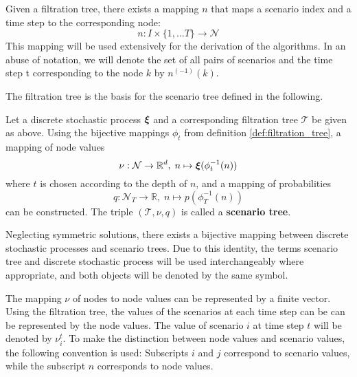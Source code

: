 \begin{remark}
  Given a filtration tree, there exists a mapping $n$ that maps a scenario index and a time step to the corresponding node:
  \begin{equation}
    \label{eq:71}
    n:I\times \{1,\ldots T\}\rightarrow\mathcal{N}
  \end{equation}
  This mapping will be used extensively for the derivation of the algorithms.
  In an abuse of notation, we will denote the set of all pairs of scenarios and the time step t corresponding to the node $k$ by $n^{(-1)}(k)$.
\end{remark}
The filtration tree is the basis for the scenario tree defined in the following.
\begin{definition}
  Let a discrete stochastic process $\boldsymbol\xi$ and a corresponding filtration tree $\mathcal{T}$ be given as above.
  Using the bijective mappings $\phi_t$ from definition \ref{def:filtration_tree}, a mapping of node values
  \[
  \nu:\mathcal{N}\rightarrow\mathbb{R}^d,\; n\mapsto \boldsymbol\xi(\phi_t^{-1}(n))
  \]
  where $t$ is chosen according to the depth of $n$,
  and a mapping of probabilities
  \[
  q:\mathcal{N}_T\rightarrow\mathbb{R},\; n\mapsto p(\phi_T^{-1}(n))
  \]
  can be constructed.
  The triple $(\mathcal{T}, \nu, q)$ is called a \textbf{scenario tree}.
\end{definition}
Neglecting symmetric solutions, there exists a bijective mapping between discrete stochastic processes and scenario trees.
Due to this identity, the terms scenario tree and discrete stochastic process will be used interchangeably where appropriate, and both objects will be denoted by the same symbol.
\begin{remark}
The mapping $\nu$ of nodes to node values can be represented by a finite vector.
Using the filtration tree, the values of the scenarios at each time step can be can be represented by the node values.
The value of scenario $i$ at time step $t$ will be denoted by $\nu_i^t$. To make the distinction between node values and scenario values, the following convention is used: Subscripts $i$ and $j$ correspond to scenario values, while the subscript $n$ corresponds to node values.
\end{remark}

